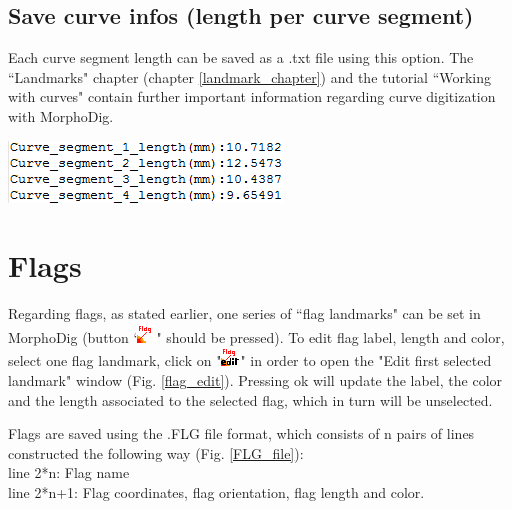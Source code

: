 \subsection{Save curve infos (length per curve segment)}
\begin{minipage}{0.55\textwidth}

Each curve segment length can be saved as a .txt file
using this option.
The ``Landmarks" chapter (chapter \ref{landmark_chapter}) and the
tutorial ``Working with curves" contain further important
information regarding curve digitization with MorphoDig.

\end{minipage}  
 \begin{minipage}{0.45\textwidth}\centering
  \includegraphics[scale=0.5]{images/07/curves/Curve_infos.png}
 \end{minipage} 

\section{Flags}

Regarding flags, as stated earlier, one series of ``flag landmarks" can be set in MorphoDig (button `\includegraphics[scale=0.7]{images/04/flag_landmarks.png}" should
be pressed). To edit flag label, length and color, select one
flag landmark, click on "\includegraphics[scale=0.7]{images/06/objects/flag_edit.png}" in order to open the "Edit first selected landmark" window (Fig. \ref{flag_edit}). Pressing ok will update the label, the color and the length associated to the selected flag, which in turn will be unselected. 

\noindent
Flags are saved using the .FLG file format, which consists of n pairs of lines constructed the following way (Fig. \ref{FLG_file}):\\
line 2*n: Flag name\\
line 2*n+1: Flag coordinates, flag orientation, flag length and color.

